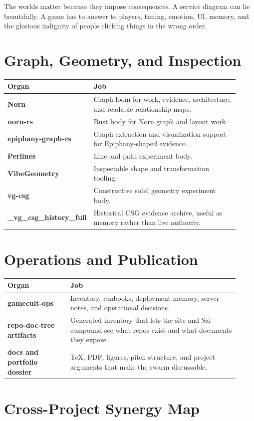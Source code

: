 \documentclass[11pt,oneside]{article}
\begin{document}
The worlds matter because they impose consequences. A service diagram can lie
beautifully. A game has to answer to players, timing, emotion, UI, memory, and
the glorious indignity of people clicking things in the wrong order.

\section{Graph, Geometry, and Inspection}

\begin{longtable}{>{\bfseries}p{0.25\linewidth}p{0.67\linewidth}}
\toprule
Organ & Job\\
\midrule
Norn & Graph loom for work, evidence, architecture, and readable relationship maps.\\
norn-rs & Rust body for Norn graph and layout work.\\
epiphany-graph-rs & Graph extraction and visualization support for Epiphany-shaped evidence.\\
Perlines & Line and path experiment body.\\
VibeGeometry & Inspectable shape and transformation tooling.\\
vg-csg & Constructive solid geometry experiment body.\\
\_vg\_csg\_history\_full & Historical CSG evidence archive, useful as memory rather than live authority.\\
\bottomrule
\end{longtable}

\section{Operations and Publication}

\begin{longtable}{>{\bfseries}p{0.25\linewidth}p{0.67\linewidth}}
\toprule
Organ & Job\\
\midrule
gamecult-ops & Inventory, runbooks, deployment memory, server notes, and operational decisions.\\
repo-doc-tree artifacts & Generated inventory that lets the site and Sai compound see what repos exist and what documents they expose.\\
docs and portfolio dossier & TeX, PDF, figures, pitch structure, and project arguments that make the swarm discussable.\\
\bottomrule
\end{longtable}

\section{Cross-Project Synergy Map}
\end{document}
